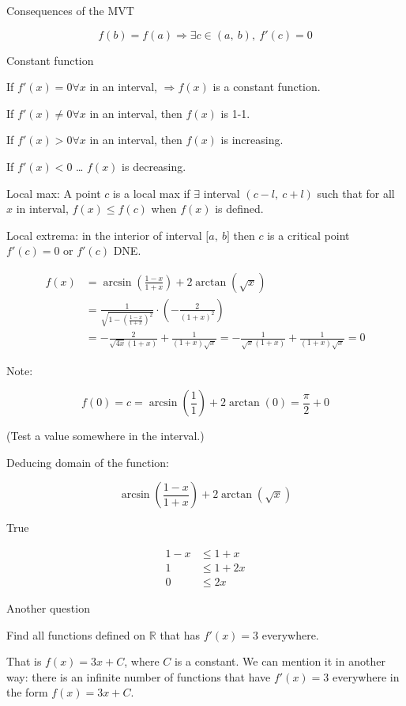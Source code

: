 \documentclass[
]{article}
\begin{document}
Consequences of the MVT

$$f(b) = f(a) \Rightarrow \exists c \in (a,\ b),\ f'(c) = 0$$

Constant function

If $f'(x) = 0\forall x$ in an interval, $\Rightarrow f(x)$ is a
constant function.

If $f'(x) \neq 0\forall x$ in an interval, then $f(x)$ is 1-1.

If $f'(x) > 0\forall x$ in an interval, then $f(x)$ is
increasing.

If $f'(x) < 0$ \ldots{} $f(x)$ is decreasing.

Local max: A point $c$ is a local max if $\exists$ interval
$(c - l,\ c + l)$ such that for all $x$ in interval,
$f(x) \leq f(c)$ when $f(x)$ is defined.

Local extrema: in the interior of interval $\lbrack a,\ b\rbrack$ then
$c$ is a critical point $f'(c) = 0$ or $f'(c)$ DNE.

\begin{align*}
f(x) &= \arcsin\left( \frac{1 - x}{1 + x} \right) + 2\arctan\left( \sqrt{x} \right)
 \\
&= \frac{1}{\sqrt{1 - \left( \frac{1 - x}{1 + x} \right)^{2}}} \cdot \left( - \frac{2}{(1 + x)^{2}} \right)
 \\
&= - \frac{2}{\sqrt{4x}(1 + x)} + \frac{1}{(1 + x)\sqrt{x}} = - \frac{1}{\sqrt{x}(1 + x)} + \frac{1}{(1 + x)\sqrt{x}} = 0
\end{align*}


Note:

$$f(0) = c = \arcsin\left( \frac{1}{1} \right) + 2\arctan(0) = \frac{\pi}{2} + 0$$

(Test a value somewhere in the interval.)

Deducing domain of the function:

$$\arcsin\left( \frac{1 - x}{1 + x} \right) + 2\arctan\left( \sqrt{x} \right)
$$

True

\begin{align*}
1 - x &\leq 1 + x
 \\
1 &\leq 1 + 2x
 \\
0 &\leq 2x
\end{align*}


Another question

Find all functions defined on $\mathbb{R}$ that has $f'(x) = 3$
everywhere.

That is $f(x) = 3x + C$, where $C$ is a constant. We can mention it
in another way: there is an infinite number of functions that have
$f'(x) = 3$ everywhere in the form $f(x) = 3x + C$.
\end{document}
